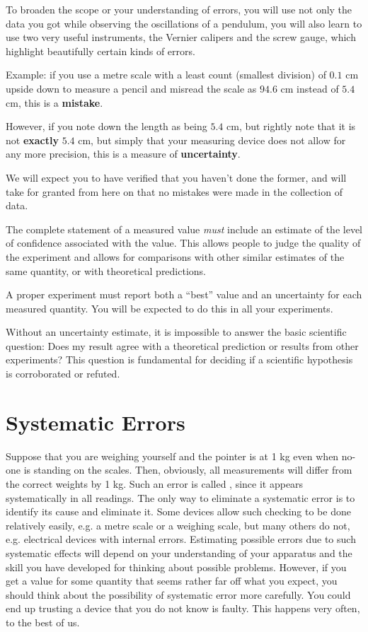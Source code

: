 To broaden the scope or your understanding of errors, you will use not only the data you got while observing the oscillations of a pendulum, you will also learn to use two very useful instruments, the Vernier calipers and the screw gauge, which highlight beautifully certain kinds of errors.

\begin{tip}
Example: if you use a metre scale with a least count (smallest division) of $0.1$ cm upside down to measure a pencil and misread the scale as $94.6$ cm instead of $5.4$ cm, this is a \textbf{mistake}.

However, if you note down the length as being $5.4$ cm, but rightly note that it is not \textbf{exactly} $5.4$ cm, but simply that your measuring device does not allow for any more precision, this is a measure of \textbf{uncertainty}. 

We will expect you to have verified that you haven't done the former, and will take for granted from here on that no mistakes were made in the collection of data.
\end{tip}

The complete statement of a measured value \textit{must} include an estimate of the level of confidence associated with the value. This allows people to judge the quality of the experiment and allows for comparisons with other similar estimates of the same quantity, or with theoretical predictions.

\begin{imp}
A proper experiment must report both a ``best'' value and an uncertainty for each measured quantity. You will be expected to do this in all your experiments. 
\end{imp}

Without an uncertainty estimate, it is impossible to answer the basic scientific question: Does my result agree with a theoretical prediction or results from other experiments? This question is fundamental for deciding if a scientific hypothesis is corroborated or refuted.

\section{Systematic Errors} 

Suppose that you are weighing yourself and the pointer is at 1 kg even when no-one is standing on the scales. Then, obviously, all measurements will differ from the correct weights by 1 kg. Such an error is called , since it appears systematically in all readings. The only way to eliminate a systematic error is to identify its cause and eliminate it. Some devices allow such checking to be done relatively easily, e.g. a metre scale or a weighing scale, but many others do not, e.g. electrical devices with internal errors. Estimating possible errors due to such systematic effects will depend on your understanding of your apparatus and the skill you have developed for thinking about possible problems.  However, if you get a value for some quantity that seems rather far off what you expect, you should think about the possibility of systematic error more carefully. You could end up trusting a device that you do not know is faulty. This happens very often, to the best of us. 

